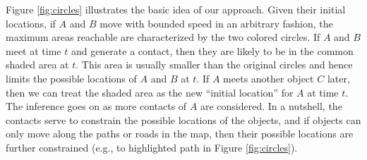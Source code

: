 Figure \ref{fig:circles} illustrates the basic idea of our approach.
Given their initial locations, if $A$ and $B$ move with 
bounded speed in an arbitrary fashion, the maximum areas reachable are
characterized by the two colored circles. If $A$ and $B$ meet at time $t$
and generate a contact, then they are likely to be in the common shaded area
at $t$. This area is usually smaller than the original circles and 
hence limits the possible locations of $A$ and $B$ at $t$. 
If $A$ meets another object $C$ later, then we can treat the shaded area 
as the new ``initial location'' for $A$ at time $t$. The inference
goes on as more contacts of $A$ are considered. 
In a nutshell, the contacts serve to constrain the possible locations 
of the objects, and if objects can only 
move along the paths or roads in the map, then their possible locations are
further constrained (e.g., to highlighted path in Figure \ref{fig:circles}). 

%
%

